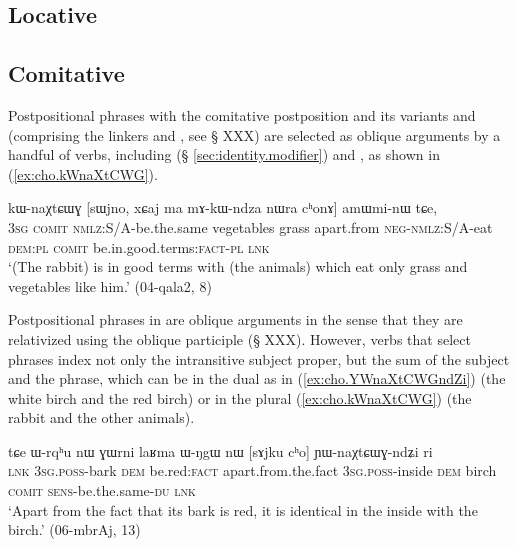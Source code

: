 \subsection{Locative} \label{sec:locative}
\subsection{Comitative} \label{sec:comitative} 
Postpositional phrases with the comitative postposition  and its variants  and  (comprising the linkers  and , see § XXX) are selected as oblique arguments by a handful of verbs, including  (§ \ref{sec:identity.modifier}) and , as shown in (\ref{ex:cho.kWnaXtCWG}).

\begin{exe}
\ex \label{ex:cho.kWnaXtCWG}
 kɯ-naχtɕɯɣ [sɯjno, xɕaj ma mɤ-kɯ-ndza nɯra cʰonɤ] amɯmi-nɯ tɕe, \\
\textsc{3sg} \textsc{comit} \textsc{nmlz}:S/A-be.the.same vegetables grass apart.from \textsc{neg}-\textsc{nmlz}:S/A-eat \textsc{dem}:\textsc{pl} \textsc{comit} be.in.good.terms:\textsc{fact}-\textsc{pl} \textsc{lnk} \\
\glt `(The rabbit) is in good terms with (the animals) which eat only grass and vegetables like him.' (04-qala2, 8)
\end{exe}

Postpositional phrases in  are oblique arguments in the sense that they are relativized using the oblique participle (§ XXX). However, verbs that select  phrases index not only the intransitive subject proper, but the sum of the subject and the  phrase, which can be in the dual as in (\ref{ex:cho.YWnaXtCWGndZi}) (the white birch and the red birch) or in the plural (\ref{ex:cho.kWnaXtCWG}) (the rabbit and the other animals). 

\begin{exe}
\ex \label{ex:cho.YWnaXtCWGndZi}
\gll tɕe ɯ-rqʰu nɯ ɣɯrni laʁma ɯ-ŋgɯ nɯ [sɤjku cʰo] ɲɯ-naχtɕɯɣ-ndʑi ri\\
\textsc{lnk} \textsc{3sg}.\textsc{poss}-bark \textsc{dem} be.red:\textsc{fact} apart.from.the.fact \textsc{3sg}.\textsc{poss}-inside \textsc{dem} birch \textsc{comit} \textsc{sens}-be.the.same-\textsc{du} \textsc{lnk} \\
\glt `Apart from the fact that its bark is red, it is identical in the inside with the birch.' (06-mbrAj, 13)
\end{exe}


